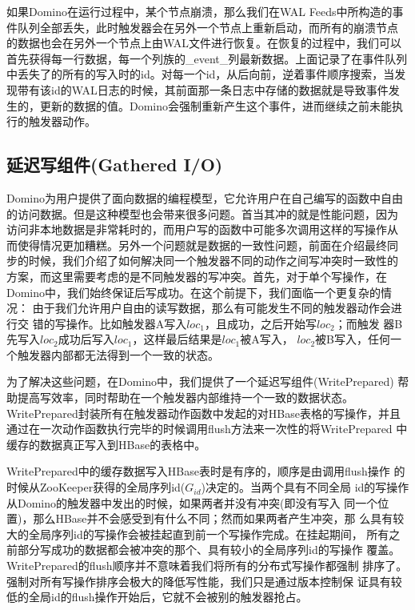 如果Domino在运行过程中，某个节点崩溃，那么我们在WAL Feeds中所构造的事
件队列全部丢失，此时触发器会在另外一个节点上重新启动，而所有的崩溃节点
的数据也会在另外一个节点上由WAL文件进行恢复。在恢复的过程中，我们可以首先获得每一行数据，每一个列族的\_event\_列最新数据。上面记录了在事件队列中丢失了的所有的写入时的id。对每一个id，从后向前，逆着事件顺序搜索，当发现带有该id的WAL日志的时候，其前面那一条日志中存储的数据就是导致事件发生的，更新的数据的值。Domino会强制重新产生这个事件，进而继续之前未能执行的触发器动作。


\subsection{延迟写组件(Gathered I/O)}
\label{section:io}
Domino为用户提供了面向数据的编程模型，它允许用户在自己编写的函数中自由
的访问数据。但是这种模型也会带来很多问题。首当其冲的就是性能问题，因为
访问非本地数据是非常耗时的，而用户写的函数中可能多次调用这样的写操作从
而使得情况更加糟糕。另外一个问题就是数据的一致性问题，前面在介绍最终同
步的时候，我们介绍了如何解决同一个触发器不同的动作之间写冲突时一致性的
方案，而这里需要考虑的是不同触发器的写冲突。首先，对于单个写操作，在
Domino中，我们始终保证后写成功。在这个前提下，我们面临一个更复杂的情况：
由于我们允许用户自由的读写数据，那么有可能发生不同的触发器动作会进行交
错的写操作。比如触发器A写入$loc_1$，且成功，之后开始写$loc_2$；而触发
器B先写入$loc_2$成功后写入$loc_1$，这样最后结果是$loc_1$被A写入，
$loc_2$被B写入，任何一个触发器内部都无法得到一个一致的状态。

为了解决这些问题，在Domino中，我们提供了一个延迟写组件(WritePrepared)
帮助提高写效率，同时帮助在一个触发器内部维持一个一致的数据状态。
WritePrepared封装所有在触发器动作函数中发起的对HBase表格的写操作，并且
通过在一次动作函数执行完毕的时候调用flush方法来一次性的将WritePrepared
中缓存的数据真正写入到HBase的表格中。

WritePrepared中的缓存数据写入HBase表时是有序的，顺序是由调用flush操作
的时候从ZooKeeper获得的全局序列id($G_{id}$)决定的。当两个具有不同全局
id的写操作从Domino的触发器中发出的时候，如果两者并没有冲突(即没有写入
同一个位置)，那么HBase并不会感受到有什么不同；然而如果两者产生冲突，那
么具有较大的全局序列id的写操作会被挂起直到前一个写操作完成。在挂起期间，
所有之前部分写成功的数据都会被冲突的那个、具有较小的全局序列id的写操作
覆盖。WritePrepared的flush顺序并不意味着我们将所有的分布式写操作都强制
排序了。强制对所有写操作排序会极大的降低写性能，我们只是通过版本控制保
证具有较低的全局id的flush操作开始后，它就不会被别的触发器抢占。


